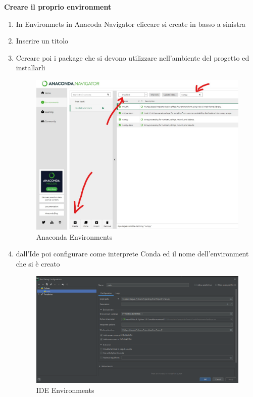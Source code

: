 \documentclass{article}
\begin{document}
\textbf{Creare il proprio environment}
\begin{enumerate}
    \item In Environmets in Anacoda Navigator cliccare si create in basso a sinistra 
    \item Inserire un titolo
    \item Cercare poi i package che si devono utilizzare nell'ambiente del progetto ed installarli 
    \begin{figure}[h!]
        \centering
        \includegraphics[scale= 0.1]{image/AncaondaEnvironmet.jpg}
        \caption{Anaconda Environments}
        \label{fig:my_label}
    \end{figure}
    \item dall'Ide poi configurare come interprete Conda ed il nome dell'environment che si è creato
     \begin{figure}[h!]
        \centering
        \includegraphics[scale= 0.2]{image/ideEnviroment}
        \caption{IDE Environments}

\end{figure}
\end{enumerate}
\end{document}
